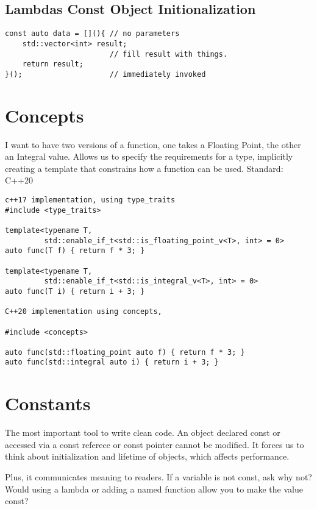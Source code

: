 \subsection{Lambdas Const Object Initionalization}

\begin{verbatim}
const auto data = [](){ // no parameters
    std::vector<int> result;
                        // fill result with things. 
    return result;
}();                    // immediately invoked
\end{verbatim}

\section{Concepts}

I want to have two versions of a function, one takes a Floating Point, the other an Integral value.
Allows us to specify the requirements for a type, implicitly creating a template
that constrains how a function can be used. Standard: C++20

\begin{verbatim}
c++17 implementation, using type_traits
#include <type_traits>

template<typename T,
         std::enable_if_t<std::is_floating_point_v<T>, int> = 0>
auto func(T f) { return f * 3; }

template<typename T,
         std::enable_if_t<std::is_integral_v<T>, int> = 0>
auto func(T i) { return i + 3; }

C++20 implementation using concepts, 

#include <concepts>

auto func(std::floating_point auto f) { return f * 3; }
auto func(std::integral auto i) { return i + 3; }
\end{verbatim}

\section{Constants}

The most important tool to write clean code.
An object declared const or accessed via a const referece or const pointer cannot be modified.
It forces us to think about initialization and lifetime of objects, which affects performance. 

Plus, it communicates meaning to readers. 
If a variable is not const, ask why not?
Would using a lambda or adding a named function allow you to make the value const?

